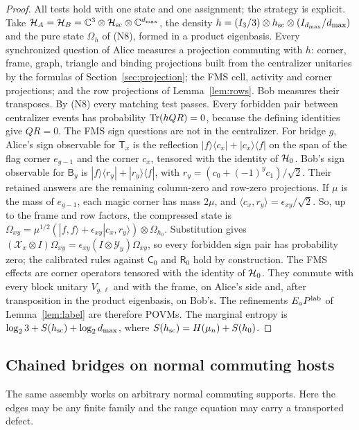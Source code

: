 \begin{proof}
All tests hold with one state and one assignment; the strategy is explicit. Take $\mathcal H_A=\mathcal H_B=\mathbb C^3\otimes\mathcal H_{\rm sc}\otimes\mathbb C^{d_{\max}}$, the density $h=(I_3/3)\otimes h_{\rm sc}\otimes(I_{d_{\max}}/d_{\max})$ and the pure state $\Omega_h$ of (N8), formed in a product eigenbasis. Every synchronized question of Alice measures a projection commuting with $h$: corner, frame, graph, triangle and binding projections built from the centralizer unitaries by the formulas of Section~\ref{sec:projection}; the FMS cell, activity and corner projections; and the row projections of Lemma~\ref{lem:rows}. Bob measures their transposes. By (N8) every matching test passes. Every forbidden pair between centralizer events has probability $\operatorname{Tr}(hQR)=0$, because the defining identities give $QR=0$. The FMS sign questions are not in the centralizer. For bridge $g$, Alice's sign observable for $\mathsf T_x$ is the reflection $|f\rangle\langle c_x|+|c_x\rangle\langle f|$ on the span of the flag corner $e_{g-1}$ and the corner $c_x$, tensored with the identity of $\mathcal H_0$. Bob's sign observable for $\mathsf B_y$ is $|f\rangle\langle r_y|+|r_y\rangle\langle f|$, with $r_y=(c_0+(-1)^yc_1)/\sqrt2$. Their retained answers are the remaining column-zero and row-zero projections. If $\mu$ is the mass of $e_{g-1}$, each magic corner has mass $2\mu$, and $\langle c_x,r_y\rangle=\epsilon_{xy}/\sqrt2$. So, up to the frame and row factors, the compressed state is $\Omega_{xy}=\mu^{1/2}(|f,f\rangle+\epsilon_{xy}|c_x,r_y\rangle)\otimes\Omega_{h_0}$. Substitution gives $(\mathcal X_x\otimes I)\Omega_{xy}=\epsilon_{xy}(I\otimes\mathcal Y_y)\Omega_{xy}$, so every forbidden sign pair has probability zero; the calibrated rules against $\mathsf C_0$ and $\mathsf R_0$ hold by construction. The FMS effects are corner operators tensored with the identity of $\mathcal H_0$. They commute with every block unitary $V_{g,\ell}$ and with the frame, on Alice's side and, after transposition in the product eigenbasis, on Bob's. The refinements $E_aP^{\rm lab}$ of Lemma~\ref{lem:label} are therefore POVMs. The marginal entropy is $\log_23+S(h_{\rm sc})+\log_2d_{\max}$, where $S(h_{\rm sc})=H(\mu_n)+S(h_0)$.\qedhere

\end{proof}


\subsection{Chained bridges on normal commuting hosts}\label{sec:chain}
The same assembly works on arbitrary normal commuting supports. Here the edges may be any finite family and the range equation may carry a transported defect.

